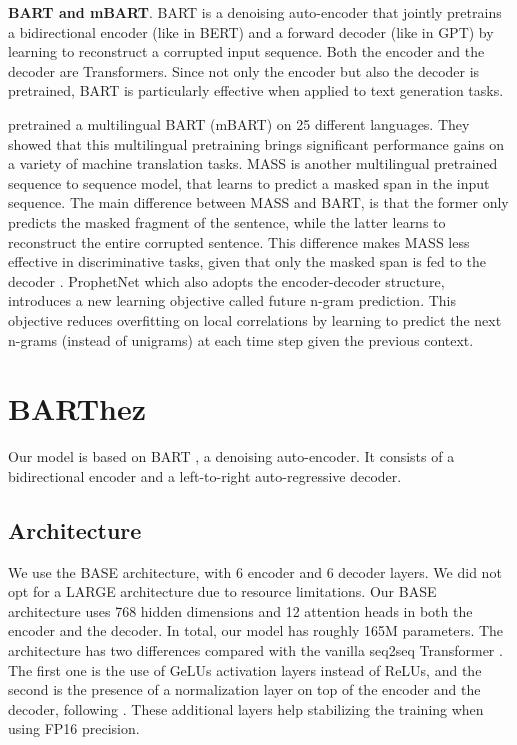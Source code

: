\documentclass[11pt,a4paper]{article}
\begin{document}
\noindent \textbf{BART and mBART}.
BART \cite{lewis2019bart} is a denoising auto-encoder that jointly pretrains a bidirectional encoder (like in BERT) and a forward decoder (like in GPT) by learning to reconstruct a corrupted input sequence.
Both the encoder and the decoder are Transformers.
Since not only the encoder but also the decoder is pretrained, BART is particularly effective when applied to text generation tasks.

\citet{liu2020multilingual} pretrained a multilingual BART (mBART) on 25 different languages.
They showed that this multilingual pretraining brings significant performance gains on a variety of machine translation tasks. 
MASS \cite{song2019mass} is another multilingual pretrained sequence to sequence model, that learns to predict a masked span in the input sequence.
The main difference between MASS and BART, is that the former only predicts the masked fragment of the sentence, while the latter learns to reconstruct the entire corrupted sentence.
This difference makes MASS less effective in discriminative tasks, given that only the masked span is fed to the decoder \cite{lewis2019bart}.
ProphetNet \cite{yan2020prophetnet} which also adopts the encoder-decoder structure, introduces a new learning objective called future n-gram prediction. This objective reduces overfitting on local correlations by learning to predict the next n-grams (instead of unigrams) at each time step given the previous context.

\section{BARThez} \label{sec:barthez}
Our model is based on BART \citep{lewis2019bart}, a denoising auto-encoder.
It consists of a bidirectional encoder and a left-to-right auto-regressive decoder.

\subsection{Architecture}
We use the BASE architecture, with 6 encoder and 6 decoder layers.
We did not opt for a LARGE architecture due to resource limitations.
Our BASE architecture uses 768 hidden dimensions and 12 attention heads in both the encoder and the decoder.
In total, our model has roughly 165M parameters.
The architecture has two differences compared with the vanilla seq2seq Transformer \citep{vaswani2017attention}.
The first one is the use of GeLUs activation layers instead of ReLUs, and the second is the presence of a normalization layer on top of the encoder and the decoder, following \citet{liu2020multilingual}.
These additional layers help stabilizing the training when using FP16 precision.
\end{document}
